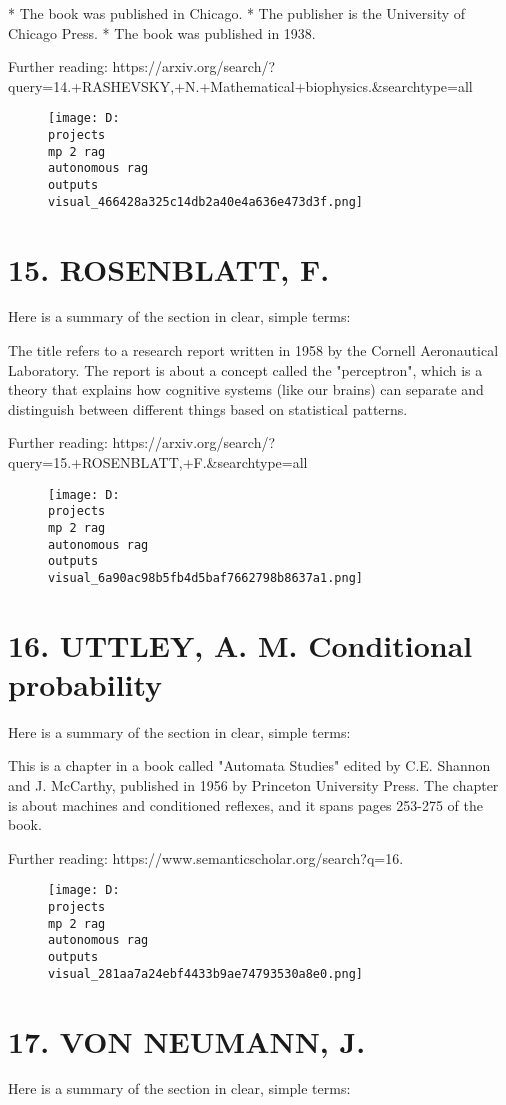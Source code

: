 \documentclass[12pt,a4paper]{article}
\begin{document}
* The book was published in Chicago.
* The publisher is the University of Chicago Press.
* The book was published in 1938.

Further reading: https://arxiv.org/search/?query=14.+RASHEVSKY,+N.+Mathematical+biophysics.&searchtype=all
\begin{figure}[h]
\centering
\texttt{[image: D:\\projects\\mp 2 rag\\autonomous rag\\outputs\\visual\_466428a325c14db2a40e4a636e473d3f.png]}
\end{figure}
\section{15. ROSENBLATT, F.}
Here is a summary of the section in clear, simple terms:

The title refers to a research report written in 1958 by the Cornell Aeronautical Laboratory. The report is about a concept called the "perceptron", which is a theory that explains how cognitive systems (like our brains) can separate and distinguish between different things based on statistical patterns.

Further reading: https://arxiv.org/search/?query=15.+ROSENBLATT,+F.&searchtype=all
\begin{figure}[h]
\centering
\texttt{[image: D:\\projects\\mp 2 rag\\autonomous rag\\outputs\\visual\_6a90ac98b5fb4d5baf7662798b8637a1.png]}
\end{figure}
\section{16. UTTLEY, A. M. Conditional probability}
Here is a summary of the section in clear, simple terms:

This is a chapter in a book called "Automata Studies" edited by C.E. Shannon and J. McCarthy, published in 1956 by Princeton University Press. The chapter is about machines and conditioned reflexes, and it spans pages 253-275 of the book.

Further reading: https://www.semanticscholar.org/search?q=16.%
\begin{figure}[h]
\centering
\texttt{[image: D:\\projects\\mp 2 rag\\autonomous rag\\outputs\\visual\_281aa7a24ebf4433b9ae74793530a8e0.png]}
\end{figure}
\section{17. VON NEUMANN, J.}
Here is a summary of the section in clear, simple terms:
\end{document}
